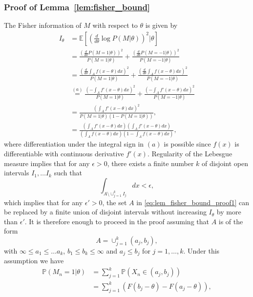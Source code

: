 \documentclass[letterpaper, 11pt]{IEEEtran}      %
\begin{document}
\subsubsection*{Proof of Lemma~\ref{lem:fisher_bound}}
The Fisher information of $M$ with respect to $\theta$ is given by
\begin{align}
I_\theta & =  \mathbb E \left[ \left( \frac{d}{d\theta} \log P\left( M | \theta \right) \right)^2 |\theta \right] \nonumber \\
& = \frac{ \left(\frac{d}{d\theta} P(M=1|\theta) \right)^2}{P(M=1| \theta)} + \frac{ \left(\frac{d}{d\theta} P(M=-1|\theta) \right)^2} {P(M=-1| \theta)} \nonumber \\
& =  \frac{ \left( \frac{d}{d\theta} \int_A f \left( x-\theta\right)dx \right)^2} { P(M=1| \theta) } + \frac{ \left( \frac{d}{d\theta}\int_A f \left( x-\theta \right)dx \right)^2} { P(M=-1| \theta) } \nonumber \\ 
& \overset{(a)}{=} \frac{ \left( - \int_A f' \left( x-\theta \right)dx \right)^2} { P(M=1| \theta) } + \frac{ \left(- \int_A f' \left( x-\theta \right)dx \right)^2} { P(M=-1| \theta) } \nonumber \\ 
& = \frac{\left( \int_A f'\left( x-\theta \right) dx \right)^2 }{  P(M=1 | \theta) \left(1-P(M=1|\theta) \right)  }, \nonumber \\
& = \frac{\left( \int_A f'\left( x-\theta \right) dx \right) \left( \int_A f'\left( x-\theta \right) dx \right)}{ \left( \int_A f \left( x-\theta \right) dx \right)  \left(1- \int_A f \left( x-\theta \right) dx \right) }, \label{eq:lem_fisher_bound_proof1}
\end{align}
where differentiation under the integral sign in $(a)$ is possible since $f(x)$ is differentiable with continuous derivative $f'(x)$. Regularity of the Lebesgue measure implies that for any $\epsilon>0$, there exists a finite number $k$ of disjoint open intervals $I_1,\ldots I_k$ such that 
\[
\int_{A\setminus \cup_{j=1}^k I_j }  dx < \epsilon,
\]
which implies that for any $\epsilon' > 0$, the set $A$ in \eqref{eq:lem_fisher_bound_proof1} can be replaced by a finite union of disjoint intervals without increasing $I_\theta$ by more than $\epsilon'$. It is therefore enough to proceed in the proof assuming that $A$ is of the form
\[
A = \cup_{j=1}^k (a_j,b_j),
\]
with $\infty \leq a_1 \leq \ldots a_k$, $b_1 \leq b_k \leq \infty$ and $a_j \leq b_j$ for $j=1,\ldots,k$. Under this assumption we have
\begin{align*}
\mathbb P(M_n=1| \theta) & = \sum_{j=1}^k \mathbb P\left(X_n \in (a_j,b_j) \right)  \\
& = \sum_{j=1}^k \left( F \left(b_j-\theta\right) -  F \left(a_j-\theta\right)  \right),
\end{align*}
\end{document}
